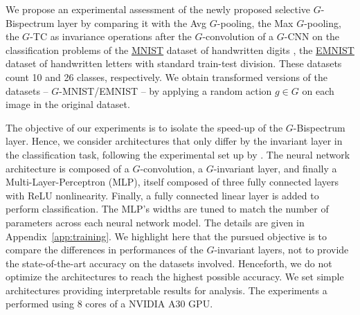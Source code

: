 \documentclass{article}
\theoremstyle{plain}
\theoremstyle{definition}
\theoremstyle{remark}
\begin{document}
We propose an experimental assessment of the newly proposed selective $G$-Bispectrum layer by comparing it with the Avg $G$-pooling, the Max $G$-pooling, the $G$-TC as invariance operations after the $G$-convolution of a $G$-CNN on the classification problems of the \href{http://yann.lecun.com/exdb/mnist/}{MNIST} dataset of handwritten digits \citep{lecun2010mnist}, the \href{https://www.nist.gov/itl/products-and-services/emnist-dataset}{EMNIST} dataset of handwritten letters \citep{cohen2017emnist} with standard train-test division. These datasets count 10 and 26 classes, respectively. We obtain transformed versions of the datasets -- $G$-MNIST/EMNIST -- by applying a random action $g\in G$ on each image in the original dataset.

The objective of our experiments is to isolate the speed-up of the $G$-Bispectrum layer. Hence, we consider architectures that only differ by the invariant layer in the classification task, following the experimental set up by \citep{sanborn2023general}.  The neural network architecture is composed of a $G$-convolution, a $G$-invariant layer, and finally a Multi-Layer-Perceptron (MLP), itself composed of three fully connected layers with ReLU nonlinearity. Finally, a fully connected linear layer is added to perform classification. The MLP's widths are tuned to match the number of parameters across each neural network model. The details are given in Appendix~\ref{app:training}. We highlight here that the pursued objective is to compare the differences in performances of the $G$-invariant layers, not to provide the state-of-the-art accuracy on the datasets involved. Henceforth, we do not optimize the architectures to reach the highest possible accuracy. We set simple architectures providing interpretable results for analysis. The experiments a performed using $8$ cores of a NVIDIA A30 GPU.
\end{document}
